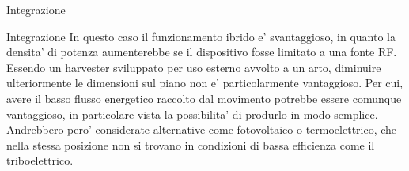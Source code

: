 \begin{section}{Integrazione}
\begin{subsection}{Integrazione}
        In questo caso il funzionamento ibrido e' svantaggioso, in quanto la densita' di potenza aumenterebbe se il dispositivo fosse limitato a una fonte RF. Essendo un harvester sviluppato per uso esterno avvolto a un arto, diminuire ulteriormente le dimensioni sul piano non e' particolarmente vantaggioso. Per cui, avere il basso flusso energetico raccolto dal movimento potrebbe essere comunque vantaggioso, in particolare vista la possibilita' di produrlo in modo semplice. Andrebbero pero' considerate alternative come fotovoltaico o termoelettrico, che nella stessa posizione non si trovano in condizioni di bassa efficienza come il triboelettrico. 
    \end{subsection}


\end{section}